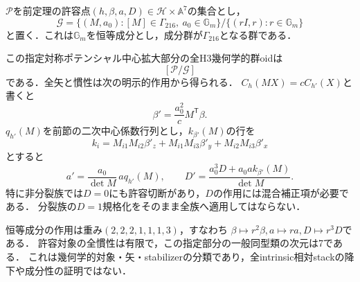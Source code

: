 $\mathcal P$を前定理の許容点$(h,\beta,a,D)\in\mathcal H\times\mathbb A^7$の集合とし，
\[
 \mathcal G=\{(M,a_0):[M]\in\Gamma_{216},\ a_0\in\mathbb G_m\}
                 /\{(rI,r):r\in\mathbb G_m\}
\]
と置く．これは$\mathbb G_m$を恒等成分とし，成分群が$\Gamma_{216}$となる群である．

\begin{theorem}[全定数項と全切断の幾何学的矢]
\label{thm:beta-global-geometric-classification}
この指定対称ポテンシャル中心拡大部分の全H3幾何学的群oidは
\[
 [\mathcal P/\mathcal G]
\]
である．全矢と慣性は次の明示的作用から得られる．
$C_h(MX)=cC_{h'}(X)$と書くと
\[
 \beta'=\frac{a_0^2}{c}M^{\mathsf T}\beta.
\]
$q_{h'}(M)$を前節の二次中心係数行列とし，$k_{\beta'}(M)$の行を
\[
 k_i=M_{i1}M_{i2}\beta'_z+M_{i1}M_{i3}\beta'_y+M_{i2}M_{i3}\beta'_x
\]
とすると
\[
 a'=\frac{a_0}{\det M}\,a q_{h'}(M),\qquad
 D'=\frac{a_0^3D+a_0a k_{\beta'}(M)}{\det M}.
\]
特に非分裂族では$D=0$にも許容切断があり，$D$の作用には混合補正項が必要である．
分裂族の$D=1$規格化をそのまま全族へ適用してはならない．

恒等成分の作用は重み$(2,2,2,1,1,1,3)$，すなわち
$\beta\mapsto r^2\beta,a\mapsto ra,D\mapsto r^3D$である．
許容対象の全慣性は有限で，この指定部分の一般同型類の次元は7である．
これは幾何学的対象・矢・stabilizerの分類であり，全intrinsic相対stackの降下や成分性の証明ではない．
\end{theorem}
